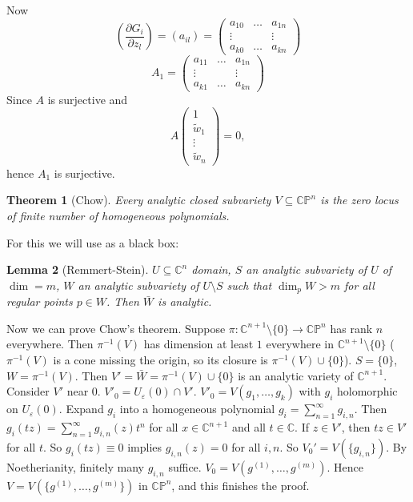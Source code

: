 \documentclass[11pt,A4]{article}
\theoremstyle{plain}
\newtheorem{thm}{Theorem}[section]
\newtheorem{lm}[thm]{Lemma}
\theoremstyle{definition}
\theoremstyle{remark}
\newcommand{\1}{\mathbbm{1}}
\newcommand{\C}{\mathbb{C}}
\newcommand{\CP}{\mathbb{CP}}
\begin{document}
Now
\[(\frac{\partial G_{i}}{\partial z_{l}})=(a_{il})=\begin{pmatrix} a_{10} & \ldots & a_{1n} \\ \vdots & & \vdots \\ a_{k0} & \ldots & a_{kn}\end{pmatrix}\]
\[A_{1}=\begin{pmatrix} a_{11} & \ldots & a_{1n} \\ \vdots & & \vdots \\ a_{k1} & \ldots & a_{kn} \end{pmatrix}\]
Since $A$ is surjective and 
\[A\begin{pmatrix} 1 \\ \tilde{w}_{1} \\ \vdots \\ \tilde{w}_{n}\end{pmatrix}=0,\]
hence $A_{1}$ is surjective.

\begin{thm}[Chow]
    Every analytic closed subvariety $V\subseteq \CP^{n}$ is the zero locus of finite number of homogeneous polynomials.
\end{thm}

For this we will use as a black box:

\begin{lm}[Remmert-Stein]
    $U\subseteq \C^{n}$ domain, $S$ an analytic subvariety of $U$ of $\dim=m$, $W$ an analytic subvariety of $U\setminus S$ such that $\dim_{p}W>m$ for all regular points $p\in W$.
    Then $\bar{W}$ is analytic.
\end{lm}

Now we can prove Chow's theorem.
Suppose $\pi\colon \C^{n+1}\setminus \{ 0\}\to \CP^{n}$ has rank $n$ everywhere.
Then $\pi^{-1}(V)$ has dimension at least $1$ everywhere in $\C^{n+1}\setminus \{0 \}$ ($\pi^{-1}(V)$ is a cone missing the origin, so its closure is $\pi^{-1}(V)\cup \{0\}$).
$S=\{0\}$, $W=\pi^{-1}(V)$. 
Then $V'=\bar{W}=\pi^{-1}(V)\cup \{0\}$ is an analytic variety of $\C^{n+1}$.
Consider $V'$ near $0$.
$V'_{0}=U_{\varepsilon}(0)\cap V'$.
$V'_{0}=V(g_{1},\ldots,g_{k})$ with $g_{i}$ holomorphic on $U_{\varepsilon }(0)$.
Expand $g_{i}$ into a homogeneous polynomial $g_{i}=\sum_{n=1}^{\infty} g_{i,n}$.
Then $g_{i}(tz)=\sum_{n=1}^{\infty}g_{i,n}(z)t^{n}$ for all $x\in \C^{n+1}$ and all $t\in \C$.
If $z\in V'$, then $tz\in V'$ for all $t$.
So $g_{i}(tz)\equiv 0$ implies $g_{i,n}(z)=0$ for all $i,n$.
So $V_{0}'=V(\{g_{i,n}\})$.
By Noetherianity, finitely many $g_{i,n}$ suffice.
$V_{0}=V(g^{(1)},\ldots, g^{(m)})$.
Hence $V=V(\{ g^{(1)},\ldots, g^{(m)}\})$ in $\CP^{n}$, and this finishes the proof.
\end{document}
